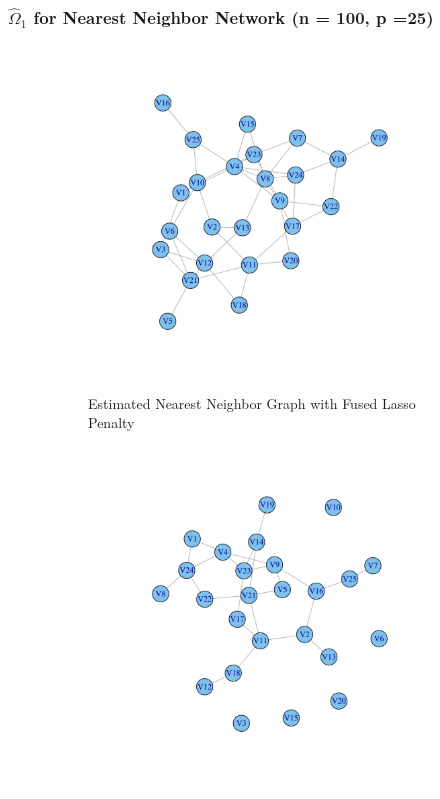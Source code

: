 \documentclass[t]{beamer}
\begin{document}
\begin{frame}
\frametitle{$\hat{\Omega}_1$ for Nearest Neighbor Network (n = 100, p =25)}
\begin{figure}
\centering 
\begin{subfigure}[b]{0.40\textwidth}
  \includegraphics[scale=0.15]{Omega1hat-f.pdf}
  \caption{Estimated Nearest Neighbor Graph with Fused Lasso Penalty}
\label{fig:nearestgaphsestimate}
\end{subfigure}
\begin{subfigure}[b]{0.40\textwidth}
  \includegraphics[scale=0.15]{Omega1hat-g.pdf}

\end{subfigure}
\end{figure}
\end{frame}
\end{document}
